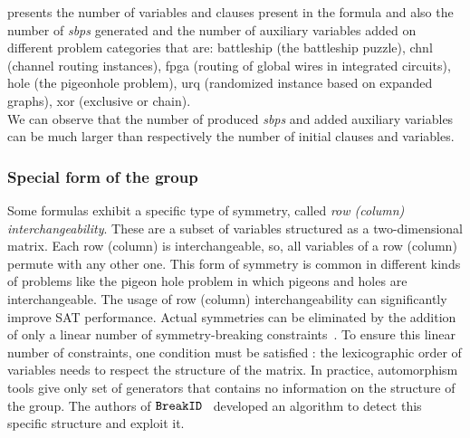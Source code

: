 

 presents the number of variables and clauses present in the formula and also the  
number of \textit{sbps} generated and the number of auxiliary variables added on different problem categories that are:
battleship (the battleship puzzle), chnl (channel routing instances), fpga (routing of global wires in integrated circuits),
 hole (the pigeonhole problem), urq (randomized instance based on expanded graphs), xor (exclusive or chain).\\
We can observe that the number of produced \textit{sbps} and added auxiliary variables can be much larger than
respectively the number of initial clauses and variables.

%
\subsubsection{Special form of the group} \label{sec:matrix-sbp}
Some formulas exhibit a specific type of symmetry, called \emph{row (column) interchangeability}. These are
a subset of variables structured as a two-dimensional matrix. Each row (column) is interchangeable,
so, all variables of a row (column) permute with any other one.
This form of symmetry is common in different kinds of problems like the pigeon hole problem in which
pigeons and holes are interchangeable. %
The usage of row (column) interchangeability can significantly improve SAT performance. 
Actual symmetries can be eliminated by the addition 
of only a linear number of symmetry-breaking constraints~\cite{flener2002breaking}. 
To ensure this linear number of constraints, one condition must be satisfied :
the lexicographic order of variables needs to respect the structure of the matrix.
In practice, automorphism tools give only  set of generators that contains no information on
the structure of the group. 
The authors of $\texttt{BreakID}$~\cite{devriendt2016improved} developed an algorithm to detect this specific 
structure and exploit it.
